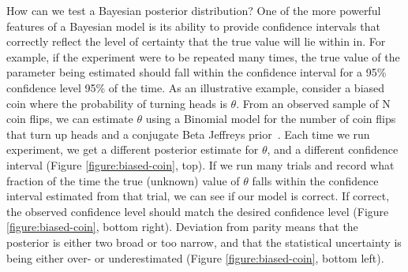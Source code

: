 \documentclass[aps,pre,twocolumn,superscriptaddress,nofootinbib]{revtex4}
\begin{document}
How can we test a Bayesian posterior distribution? 
One of the more powerful features of a Bayesian model is its ability to provide confidence intervals that correctly reflect the level of certainty that the true value will lie within in.
For example, if the experiment were to be repeated many times, the true value of the parameter being estimated should fall within the confidence interval for a 95\% confidence level 95\% of the time.
As an illustrative example, consider a biased coin where the probability of turning heads is $\theta$.
From an observed sample of N coin flips, we can estimate $\theta$ using a Binomial model for the number of coin flips that turn up heads and a conjugate Beta Jeffreys prior~\cite{jeffreys:proc-royal-soc-london:1946:jeffreys-prior,goyal:aip-proceedings:2005:jeffreys-prior}.
Each time we run experiment, we get a different posterior estimate for $\theta$, and a different confidence interval (Figure \ref{figure:biased-coin}, top).
If we run many trials and record what fraction of the time the true (unknown) value of $\theta$ falls within the confidence interval estimated from that trial, we can see if our model is correct.
If correct, the observed confidence level should match the desired confidence level (Figure \ref{figure:biased-coin}, bottom right).
Deviation from parity means that the posterior is either two broad or too narrow, and that the statistical uncertainty is being either over- or underestimated (Figure \ref{figure:biased-coin}, bottom left).
\end{document}
